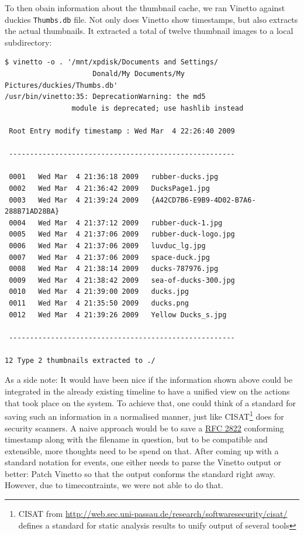 \documentclass[a4paper,
    11pt,
    normalheadings,
    parindent,
    UKenglish,
    abstracton,
    ]{scrartcl}
\begin{document}
To then obain information about the thumbnail cache, we ran Vinetto against duckies \texttt{Thumbs.db} file.
Not only does Vinetto show timestamps, but also extracts the actual thumbnails. It extracted a total of twelve thumbnail images to a local subdirectory:
\begin{verbatim}
$ vinetto -o . '/mnt/xpdisk/Documents and Settings/
                     Donald/My Documents/My Pictures/duckies/Thumbs.db'
/usr/bin/vinetto:35: DeprecationWarning: the md5
                module is deprecated; use hashlib instead

 Root Entry modify timestamp : Wed Mar  4 22:26:40 2009

 ------------------------------------------------------

 0001   Wed Mar  4 21:36:18 2009   rubber-ducks.jpg
 0002   Wed Mar  4 21:36:42 2009   DucksPage1.jpg
 0003   Wed Mar  4 21:39:24 2009   {A42CD7B6-E9B9-4D02-B7A6-288B71AD28BA}
 0004   Wed Mar  4 21:37:12 2009   rubber-duck-1.jpg
 0005   Wed Mar  4 21:37:06 2009   rubber-duck-logo.jpg
 0006   Wed Mar  4 21:37:06 2009   luvduc_lg.jpg
 0007   Wed Mar  4 21:37:06 2009   space-duck.jpg
 0008   Wed Mar  4 21:38:14 2009   ducks-787976.jpg
 0009   Wed Mar  4 21:38:42 2009   sea-of-ducks-300.jpg
 0010   Wed Mar  4 21:39:00 2009   ducks.jpg
 0011   Wed Mar  4 21:35:50 2009   ducks.png
 0012   Wed Mar  4 21:39:26 2009   Yellow Ducks_s.jpg

 ------------------------------------------------------

12 Type 2 thumbnails extracted to ./
\end{verbatim}



As a side note: It would have been nice if the information shown above could be integrated in the already existing timeline to have a unified view on the actions that took place on the system.
To achieve that, one could think of a standard for saving such an information in a normalised manner, just like CISAT\footnote{CISAT from \url{http://web.sec.uni-passau.de/research/softwaresecurity/cisat/} defines a standard for static analysis results to unify output of several tools} does for security scanners.
A naive approach would be to save a \href{http://www.ietf.org/rfc/rfc2822.txt}{RFC 2822} conforming timestamp along with the filename in question, but to be compatible and extensible, more thoughts need to be spend on that.
After coming up with a standard notation for events, one either needs to parse the Vinetto output or better: Patch Vinetto so that the output conforms the standard right away.
However, due to timecontraints, we were not able to do that.
\end{document}
